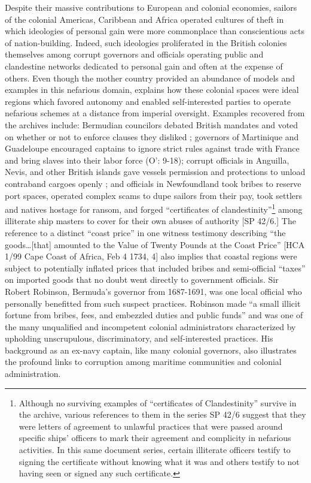 Despite their massive contributions to European and colonial economies, sailors of the colonial Americas, Caribbean and Africa operated cultures of theft in which ideologies of personal gain were more commonplace than conscientious acts of nation-building. Indeed, such ideologies proliferated in the British colonies themselves among corrupt governors and officials operating public and clandestine networks dedicated to personal gain and often at the expense of others. Even though the mother country provided an abundance of models and examples in this nefarious domain, \citet{Fusaro2015} explains how these colonial spaces were ideal regions which favored autonomy and enabled self-interested parties to operate nefarious schemes at a distance from imperial oversight. Examples recovered from the archives include: Bermudian councilors debated British mandates and voted on whether or not to enforce clauses they disliked \citep[55]{Jarvis2010}; governors of Martinique and Guadeloupe encouraged captains to ignore strict rules against trade with France and bring slaves into their labor force (O’\citealt{Malley2016}: 9-18); corrupt officials in Anguilla, Nevis, and other British islands gave vessels permission and protections to unload contraband cargoes openly \citep[173]{Jarvis2010}; and officials in Newfoundland took bribes to reserve port spaces, operated complex scams to dupe sailors from their pay, took settlers and natives hostage for ransom, and forged “certificates of clandestinity”\footnote{Although no surviving examples of “certificates of Clandestinity” survive in the archive, various references to them in the series SP 42/6 suggest that they were letters of agreement to unlawful practices that were passed around specific ships’ officers to mark their agreement and complicity in nefarious activities. In this same document series, certain illiterate officers testify to signing the certificate without knowing what it was and others testify to not having seen or signed any such certificate.}  among illiterate ship masters to cover for their own abuses of authority [SP 42/6.] The reference to a distinct “coast price” in one witness testimony describing “the goods…[that] amounted to the Value of Twenty Pounds at the Coast Price” [HCA 1/99 Cape Coast of Africa, Feb 4 1734, 4] also implies that coastal regions were subject to potentially inflated prices that included bribes and semi-official “taxes” on imported goods that no doubt went directly to government officials. Sir Robert Robinson, Bermuda’s governor from 1687-1691, was one local official who personally benefitted from such suspect practices. Robinson made “a small illicit fortune from bribes, fees, and embezzled duties and public funds” \citep[70]{Jarvis2010} and was one of the many unqualified and incompetent colonial administrators characterized by upholding unscrupulous, discriminatory, and self-interested practices. His background as an ex-navy captain, like many colonial governors, also illustrates the profound links to corruption among maritime communities and colonial administration.

